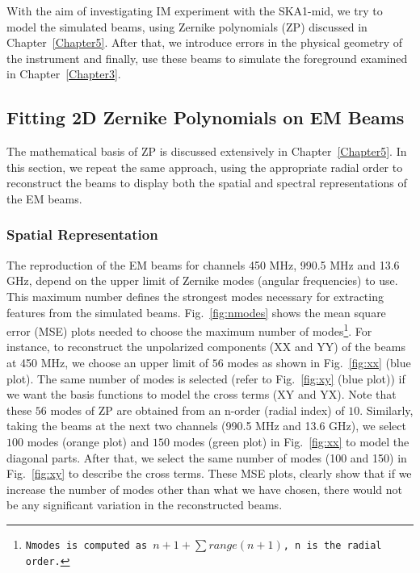 With the aim of investigating IM experiment with the SKA1-mid, we try to model the simulated beams, using Zernike polynomials (ZP) discussed in Chapter~\ref{Chapter5}. After that, we introduce errors in the physical geometry of the instrument and finally, use these beams to simulate the foreground examined in Chapter~\ref{Chapter3}.

\subsection{ Fitting 2D Zernike Polynomials on EM Beams}	  \label{chap6:zern}

The mathematical basis of ZP is discussed extensively in Chapter~\ref{Chapter5}. In this section, we repeat the same approach, using the appropriate radial order
to reconstruct the beams to display both the spatial and spectral representations of the EM beams. 

%   
\subsubsection{Spatial Representation}	  \label{chap6:zspatial}
%
The reproduction of the EM beams for channels 450 MHz, 990.5 MHz and 13.6 GHz, depend on the upper limit of Zernike modes (angular frequencies) to use. This maximum number defines the strongest modes necessary for extracting features from the simulated beams. Fig.~\ref{fig:nmodes} shows the mean square error (MSE) plots needed to choose the maximum number of modes\footnote{{\tt Nmodes is computed as $ n+1 + \sum range(n+1)$, n is the radial order.}}. For instance, to reconstruct the unpolarized components (XX and YY) of the beams at 450 MHz, we choose an upper limit of $56$ modes as shown in Fig.~\ref{fig:xx} (blue plot). The same number of modes is selected (refer to Fig.~\ref{fig:xy} (blue plot)) if we want the basis functions to model the cross terms (XY and YX). Note that these $56$ modes of ZP are obtained from an n-order (radial index) of $10$. Similarly, taking the beams at the next two channels (990.5 MHz and  13.6 GHz), we select $100$ modes (orange plot) and $150$ modes (green plot) in Fig.~\ref{fig:xx} to model the diagonal parts. After that, we select the same number of modes (100 and 150) in  Fig.~\ref{fig:xy} to describe the cross terms.  These MSE plots, clearly show that if we increase the number of modes other than what we have chosen, there would not be any significant variation  in  the reconstructed beams.


